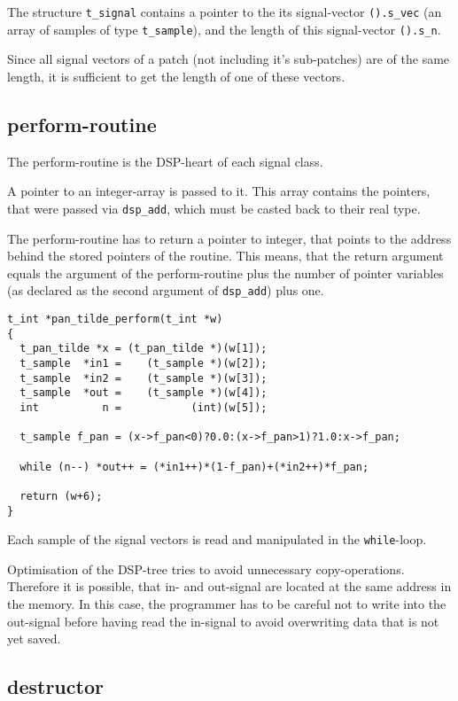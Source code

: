 \documentclass[12pt, a4paper,english,titlepage]{article}
\begin{document}
The structure \verb+t_signal+ contains a pointer to the
its signal-vector \verb+().s_vec+ (an array of samples of type  \verb+t_sample+),
and the length of this signal-vector \verb+().s_n+.

Since all signal vectors of a patch (not including it's sub-patches) are of the same length,
it is sufficient to get the length of one of these vectors.

\subsection{perform-routine}
The perform-routine is the DSP-heart of each signal class.

A pointer to an integer-array is passed to it.
This array contains the pointers, that were passed via \verb+dsp_add+,
which must be casted back to their real type.

The perform-routine has to return a pointer to integer,
that points to the address behind the stored pointers of the routine.
This means, that the return argument equals the
argument of the perform-routine plus
the number of pointer variables (as declared as the second argument
of \verb+dsp_add+) plus one.

\begin{verbatim}
t_int *pan_tilde_perform(t_int *w)
{
  t_pan_tilde *x = (t_pan_tilde *)(w[1]);
  t_sample  *in1 =    (t_sample *)(w[2]);
  t_sample  *in2 =    (t_sample *)(w[3]);
  t_sample  *out =    (t_sample *)(w[4]);
  int          n =           (int)(w[5]);

  t_sample f_pan = (x->f_pan<0)?0.0:(x->f_pan>1)?1.0:x->f_pan;

  while (n--) *out++ = (*in1++)*(1-f_pan)+(*in2++)*f_pan;

  return (w+6);
}
\end{verbatim}

Each sample of the signal vectors is read and manipulated in the \verb+while+-loop.


Optimisation of the DSP-tree tries to avoid unnecessary copy-operations.
Therefore it is possible, that in- and out-signal are located
at the same address in the memory.
In this case, the programmer has to be careful not to write into the out-signal
before having read the in-signal to avoid overwriting data that is not yet saved.

\subsection{destructor}
\end{document}
